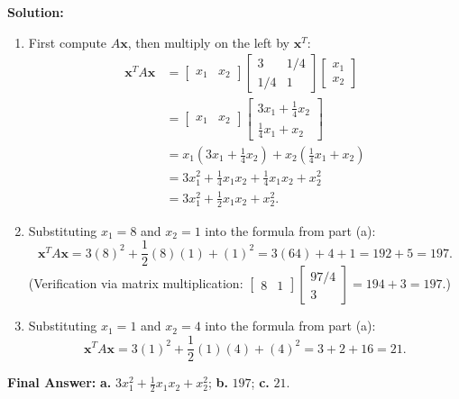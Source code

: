 \documentclass[11pt, letterpaper]{article}
\theoremstyle{definition}
\theoremstyle{remark}
\begin{document}
\textbf{Solution:}
\begin{enumerate}[label=\alph*.]
    \item First compute $A\mathbf{x}$, then multiply on the left by $\mathbf{x}^T$:
    \begin{align*}
    \mathbf{x}^T A \mathbf{x} &= \begin{bmatrix} x_1 & x_2 \end{bmatrix} \begin{bmatrix} 3 & 1/4 \\ 1/4 & 1 \end{bmatrix} \begin{bmatrix} x_1 \\ x_2 \end{bmatrix} \\
    &= \begin{bmatrix} x_1 & x_2 \end{bmatrix} \begin{bmatrix} 3x_1 + \frac{1}{4}x_2 \\ \frac{1}{4}x_1 + x_2 \end{bmatrix} \\
    &= x_1\left(3x_1 + \frac{1}{4}x_2\right) + x_2\left(\frac{1}{4}x_1 + x_2\right) \\
    &= 3x_1^2 + \frac{1}{4}x_1 x_2 + \frac{1}{4}x_1 x_2 + x_2^2 \\
    &= 3x_1^2 + \frac{1}{2}x_1 x_2 + x_2^2.
    \end{align*}
    \item Substituting $x_1 = 8$ and $x_2 = 1$ into the formula from part (a):
    \[
    \mathbf{x}^T A \mathbf{x} = 3(8)^2 + \frac{1}{2}(8)(1) + (1)^2 = 3(64) + 4 + 1 = 192 + 5 = 197.
    \]
    (Verification via matrix multiplication: $\begin{bmatrix} 8 & 1 \end{bmatrix}\begin{bmatrix} 97/4 \\ 3 \end{bmatrix} = 194 + 3 = 197$.)
    \item Substituting $x_1 = 1$ and $x_2 = 4$ into the formula from part (a):
    \[
    \mathbf{x}^T A \mathbf{x} = 3(1)^2 + \frac{1}{2}(1)(4) + (4)^2 = 3 + 2 + 16 = 21.
    \]
\end{enumerate}
\textbf{Final Answer:} \textbf{a.} $3x_1^2 + \frac{1}{2}x_1 x_2 + x_2^2$; \quad \textbf{b.} $197$; \quad \textbf{c.} $21$.

\hrulefill
\end{document}
